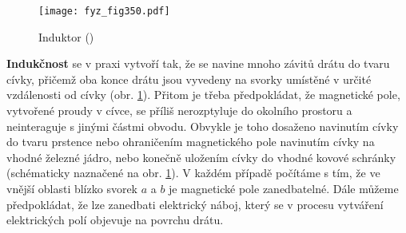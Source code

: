 {  \begin{figure}[ht!] %
    \centering
    \texttt{[image: fyz\_fig350.pdf]}
    \caption{Induktor
             (\cite[s.~391]{Feynman02})}
    \label{fyz:fig350}
  \end{figure}
   
  \textbf{Indukčnost} se v praxi vytvoří tak, že se navine mnoho závitů drátu do tvaru cívky, 
  přičemž oba konce drátu jsou vyvedeny na svorky umístěné v určité vzdálenosti od cívky (obr. 
  \ref{fyz:fig350}). Přitom je třeba předpokládat, že magnetické pole, vytvořené proudy v cívce, se 
  příliš nerozptyluje do okolního prostoru a neinteraguje s jinými částmi obvodu. Obvykle je toho 
  dosaženo navinutím cívky do tvaru prstence nebo ohraničením magnetického pole navinutím cívky na 
  vhodné železné jádro, nebo konečně uložením cívky do vhodné kovové schránky (schématicky 
  naznačené na obr. \ref{fyz:fig350}). V každém případě počítáme s tím, že ve vnější oblasti blízko 
  svorek \(a\) a \(b\) je magnetické pole zanedbatelné. Dále můžeme předpokládat, že lze zanedbati 
  elektrický náboj, který se v procesu vytváření elektrických polí objevuje na povrchu drátu.
  
}
